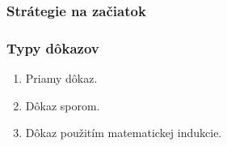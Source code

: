 {\subsubsection*{Strátegie na začiatok}

\subsubsection*{Typy dôkazov}

\begin{enumerate}
\item Priamy dôkaz.
\item Dôkaz sporom.
\item Dôkaz použitím matematickej indukcie.
\end{enumerate}

}

